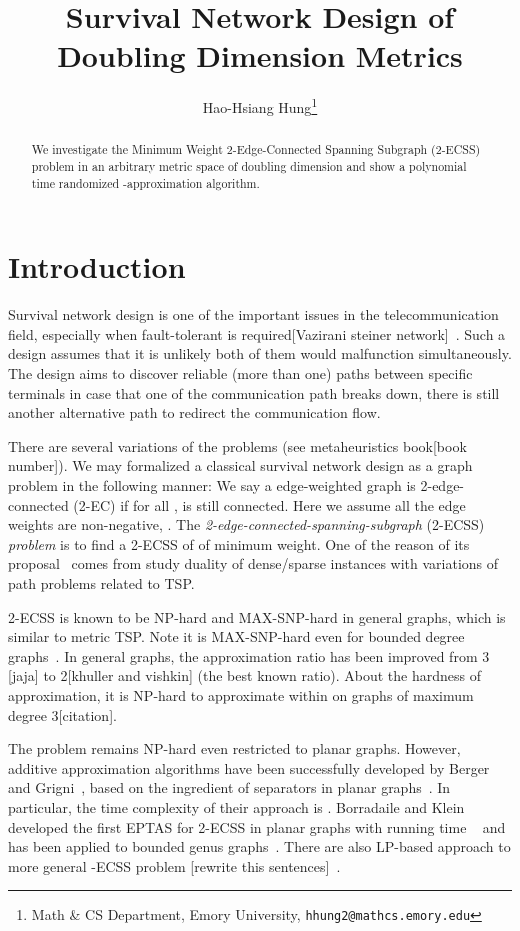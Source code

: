 \documentclass{llncs}
\title{Survival Network Design of Doubling Dimension Metrics}
\author{Hao-Hsiang Hung\thanks{Math \& CS Department,
        Emory University, {\tt hhung2@mathcs.emory.edu}}
}
\institute{Emory University}
\begin{document}
\thispagestyle{empty}
\maketitle

\begin{abstract}
We investigate the Minimum Weight 2-Edge-Connected Spanning Subgraph (2-ECSS) problem in an arbitrary metric space of doubling dimension and show a polynomial time randomized -approximation algorithm.

\end{abstract}

\section{Introduction}
Survival network design is one of the important issues in the telecommunication field, especially when fault-tolerant is required[Vazirani steiner network]~\cite{Guptasurvey}.
Such a design assumes that it is unlikely both of them would malfunction simultaneously.
The design aims to discover reliable (more than one) paths between specific terminals in case that one of the communication path breaks down, there is still another alternative path to redirect the communication flow.

There are several variations of the problems (see metaheuristics book[book number]).
We may formalized a classical survival network design as a graph problem in the following manner:
We say a edge-weighted graph  is 2-edge-connected (2-EC) if for all ,  is still connected.
Here we assume all the edge weights are non-negative, .
The \emph{2-edge-connected-spanning-subgraph} (2-ECSS) \emph{problem} is to find a 2-ECSS of  of minimum weight.
One of the reason of its proposal~\cite{Csaba02} comes from study duality of dense/sparse instances with variations of path problems related to TSP.

2-ECSS is known to be NP-hard and MAX-SNP-hard in general graphs, which is similar to metric TSP.
Note it is MAX-SNP-hard even for bounded degree graphs~\cite{Grigni07}.
In general graphs, the approximation ratio has been improved from 3 [jaja] to 2[khuller and vishkin] (the best known ratio).
About the hardness of approximation, it is NP-hard to approximate within  on graphs of maximum degree 3[citation].

The problem remains NP-hard even restricted to planar graphs.
However, additive approximation algorithms have been successfully developed by Berger and Grigni~\cite{Grigni05,Grigni07}, based on the ingredient of separators in planar graphs~\cite{Grigni00}.
In particular, the time complexity of their approach is .
Borradaile and Klein developed the first EPTAS for 2-ECSS in planar graphs with running time ~\cite{Borradaile08} and has been applied to bounded genus graphs~\cite{Borradaile09}.
There are also LP-based approach to more general -ECSS problem [rewrite this sentences]~\cite{Pritchard10}.
\end{document}
